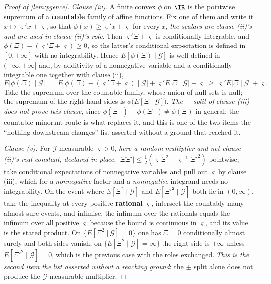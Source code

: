 \begin{proof}[Proof of \cref{lem:pgence}]
\emph{Clause (iv).} A finite convex $\phi$ on $\IR$ is the pointwise supremum of a \textbf{countable}
family of affine functions. Fix one of them and write it $x\mapsto\varsigma'x+\varsigma$, so that
$\phi(x)\ge\varsigma'x+\varsigma$ for every $x$, \emph{the scalars are clause (ii)'s and are used in
clause (ii)'s role}. Then $\varsigma'\Xi+\varsigma$ is conditionally integrable, and
$\phi(\Xi)-(\varsigma'\Xi+\varsigma)\ge0$, so the latter's conditional expectation is defined in
$[0,+\infty]$ with no integrability. Hence $E[\phi(\Xi)\mid\mathcal G]$ is well defined in
$(-\infty,+\infty]$ and, by additivity of a nonnegative variable and a conditionally integrable one
together with clause (ii),
\[
E\big[\phi(\Xi)\mid\mathcal G\big]
\;=\;E\big[\phi(\Xi)-(\varsigma'\Xi+\varsigma)\mid\mathcal G\big]
+\varsigma'E\big[\Xi\mid\mathcal G\big]+\varsigma
\;\ge\;\varsigma'E\big[\Xi\mid\mathcal G\big]+\varsigma .
\]
Take the supremum over the countable family, whose union of null sets is null; the supremum of the
right-hand sides is $\phi\big(E[\Xi\mid\mathcal G]\big)$. \emph{The $\pm$ split of clause (iii) does not
prove this clause}, since $\phi(\Xi^{+})-\phi(\Xi^{-})\ne\phi(\Xi)$ in general; the countable-minorant
route is what replaces it, and this is one of the two items the ``nothing downstream changes'' list
asserted without a ground that reached it.

\emph{Clause (v).} For $\mathcal G$-measurable $\varsigma>0$, \emph{here a random multiplier and not
clause (ii)'s real constant, declared in place}, 
$|\Xi\Xi'|\le\tfrac12(\varsigma\,\Xi^{2}+\varsigma^{-1}\Xi'^{2})$ pointwise; take conditional expectations
of nonnegative variables and pull out $\varsigma$ by clause (iii), which for a \emph{nonnegative} factor
and a \emph{nonnegative} integrand needs no integrability. On the event where $E[\Xi^{2}\mid\mathcal G]$
and $E[\Xi'^{2}\mid\mathcal G]$ both lie in $(0,\infty)$, take the inequality at every positive
\textbf{rational} $\varsigma$, intersect the countably many almost-sure events, and infimise; the infimum
over the rationals equals the infimum over all positive $\varsigma$ because the bound is continuous in
$\varsigma$, and its value is the stated product. On
$\{E[\Xi^{2}\mid\mathcal G]=0\}$ one has $\Xi=0$ conditionally almost surely and both sides vanish; on
$\{E[\Xi^{2}\mid\mathcal G]=\infty\}$ the right side is $+\infty$ unless $E[\Xi'^{2}\mid\mathcal G]=0$,
which is the previous case with the roles exchanged. \emph{This is the second item the list asserted
without a reaching ground}: the $\pm$ split alone does not produce the $\mathcal G$-measurable multiplier.
\end{proof}

